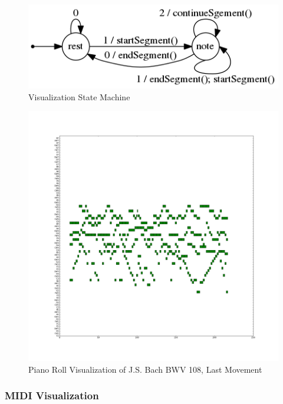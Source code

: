 \begin{figure}
  \begin{center}
    \includegraphics[scale=0.75]{resources/visualizationFSM}
    \caption{Visualization State Machine}
    \label{fig:visualizationStateMachine}
  \end{center}
\end{figure}

\begin{figure}
  \begin{center}
    \includegraphics[scale=0.35]{resources/bwv108PianoRoll}
    \caption{Piano Roll Visualization of J.S. Bach BWV 108, Last Movement}
    \label{fig:bwv108PianoRoll}
  \end{center}
\end{figure}

\subsubsection{MIDI Visualization}

